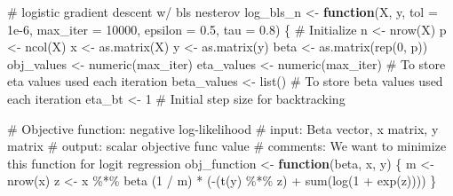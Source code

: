 \documentclass[
  letterpaper,
  DIV=11,
  numbers=noendperiod]{scrartcl}
\newenvironment{Shaded}{\begin{snugshade}}{\end{snugshade}}
\newcommand{\AttributeTok}[1]{\textcolor[rgb]{0.40,0.45,0.13}{#1}}
\newcommand{\CommentTok}[1]{\textcolor[rgb]{0.37,0.37,0.37}{#1}}
\newcommand{\ControlFlowTok}[1]{\textcolor[rgb]{0.00,0.23,0.31}{\textbf{#1}}}
\newcommand{\DecValTok}[1]{\textcolor[rgb]{0.68,0.00,0.00}{#1}}
\newcommand{\FloatTok}[1]{\textcolor[rgb]{0.68,0.00,0.00}{#1}}
\newcommand{\FunctionTok}[1]{\textcolor[rgb]{0.28,0.35,0.67}{#1}}
\newcommand{\NormalTok}[1]{\textcolor[rgb]{0.00,0.23,0.31}{#1}}
\newcommand{\OtherTok}[1]{\textcolor[rgb]{0.00,0.23,0.31}{#1}}
\newcommand{\SpecialCharTok}[1]{\textcolor[rgb]{0.37,0.37,0.37}{#1}}
\begin{document}
\begin{Shaded}
\begin{Highlighting}[]
\CommentTok{\# logistic gradient descent w/ bls nesterov}
\NormalTok{log\_bls\_n }\OtherTok{\textless{}{-}} \ControlFlowTok{function}\NormalTok{(X, y, }\AttributeTok{tol =} \FloatTok{1e{-}6}\NormalTok{, }\AttributeTok{max\_iter =} \DecValTok{10000}\NormalTok{, }\AttributeTok{epsilon =} \FloatTok{0.5}\NormalTok{, }\AttributeTok{tau =} \FloatTok{0.8}\NormalTok{) \{}
  \CommentTok{\# Initialize}
\NormalTok{  n }\OtherTok{\textless{}{-}} \FunctionTok{nrow}\NormalTok{(X)}
\NormalTok{  p }\OtherTok{\textless{}{-}} \FunctionTok{ncol}\NormalTok{(X)}
\NormalTok{  x }\OtherTok{\textless{}{-}} \FunctionTok{as.matrix}\NormalTok{(X)}
\NormalTok{  y }\OtherTok{\textless{}{-}} \FunctionTok{as.matrix}\NormalTok{(y)}
\NormalTok{  beta }\OtherTok{\textless{}{-}} \FunctionTok{as.matrix}\NormalTok{(}\FunctionTok{rep}\NormalTok{(}\DecValTok{0}\NormalTok{, p))}
\NormalTok{  obj\_values }\OtherTok{\textless{}{-}} \FunctionTok{numeric}\NormalTok{(max\_iter)}
\NormalTok{  eta\_values }\OtherTok{\textless{}{-}} \FunctionTok{numeric}\NormalTok{(max\_iter)  }\CommentTok{\# To store eta values used each iteration}
\NormalTok{  beta\_values }\OtherTok{\textless{}{-}} \FunctionTok{list}\NormalTok{() }\CommentTok{\# To store beta values used each iteration}
\NormalTok{  eta\_bt }\OtherTok{\textless{}{-}} \DecValTok{1}  \CommentTok{\# Initial step size for backtracking}
  
  \CommentTok{\# Objective function: negative log{-}likelihood}
  \CommentTok{\# input: Beta vector, x matrix, y matrix}
  \CommentTok{\# output: scalar objective func value}
  \CommentTok{\# comments: We want to minimize this function for logit regression}
\NormalTok{  obj\_function }\OtherTok{\textless{}{-}} \ControlFlowTok{function}\NormalTok{(beta, x, y) \{}
\NormalTok{    m }\OtherTok{\textless{}{-}} \FunctionTok{nrow}\NormalTok{(x)}
\NormalTok{    z }\OtherTok{\textless{}{-}}\NormalTok{ x }\SpecialCharTok{\%*\%}\NormalTok{ beta}
\NormalTok{    (}\DecValTok{1} \SpecialCharTok{/}\NormalTok{ m) }\SpecialCharTok{*}\NormalTok{ (}\SpecialCharTok{{-}}\NormalTok{(}\FunctionTok{t}\NormalTok{(y) }\SpecialCharTok{\%*\%}\NormalTok{ z) }\SpecialCharTok{+} \FunctionTok{sum}\NormalTok{(}\FunctionTok{log}\NormalTok{(}\DecValTok{1} \SpecialCharTok{+} \FunctionTok{exp}\NormalTok{(z))))}
\NormalTok{  \}}
  

\end{Highlighting}
\end{Shaded}
\end{document}
